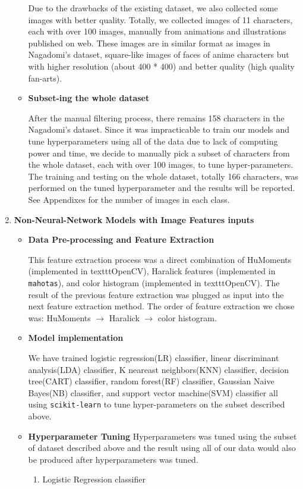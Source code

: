 \documentclass[11.5pt]{article}
\begin{document}
\begin{enumerate}
\begin{itemize}
            Due to the drawbacks of the existing dataset, we also collected some images with better quality.
            Totally, we collected images of 11 characters, each with over 100 images, manually from animations and illustrations published on web.
            These images are in similar format as images in Nagadomi's dataset, square-like images of faces of anime characters but with higher resolution (about 400 * 400) and better quality (high quality fan-arts).
            \item \textbf{Subset-ing the whole dataset}

            After the manual filtering process, there remains 158 characters in the Nagadomi's dataset.
            Since it was impracticable to train our models and tune hyperparameters using all of the data due to lack of computing power and time, we decide to manually pick a subset of characters from the whole dataset, each with over 100 images, to tune hyper-parameters.
            The training and testing on the whole dataset, totally 166 characters, was performed on the tuned hyperparameter and the results will be reported.
            See Appendixes for the number of images in each class.
        \end{itemize}
        \item \textbf{Non-Neural-Network Models with Image Features inputs}
        \begin{itemize}
            \item \textbf{Data Pre-processing and Feature Extraction}

            This feature extraction process was a direct combination of HuMoments (implemented in texttt{OpenCV}\cite{opencv_library}), Haralick features (implemented in \texttt{mahotas}\cite{mahotas}), and color histogram (implemented in texttt{OpenCV}\cite{opencv_library}).
            The result of the previous feature extraction was plugged as input into the next feature extraction method.
            The order of feature extraction we chose was: HuMoments $\rightarrow$ Haralick $\rightarrow$ color histogram.
            \item \textbf{Model implementation}

            We have trained logistic regression(LR) classifier, linear discriminant analysis(LDA) classifier, K neareast neighbors(KNN) classifier, decision tree(CART) classifier, random forest(RF) classifier, Gaussian Naive Bayes(NB) classifier, and support vector machine(SVM) classifier all using \texttt{scikit-learn}\cite{scikit-learn} to tune hyper-parameters on the subset described above.
            \item \textbf{Hyperparameter Tuning}
            Hyperparameters was tuned using the subset of dataset described above and the result using all of our data would also be produced after hyperparameters was tuned.
            \begin{enumerate}
                \item Logistic Regression classifier


\end{enumerate}
\end{itemize}
\end{enumerate}
\end{document}

